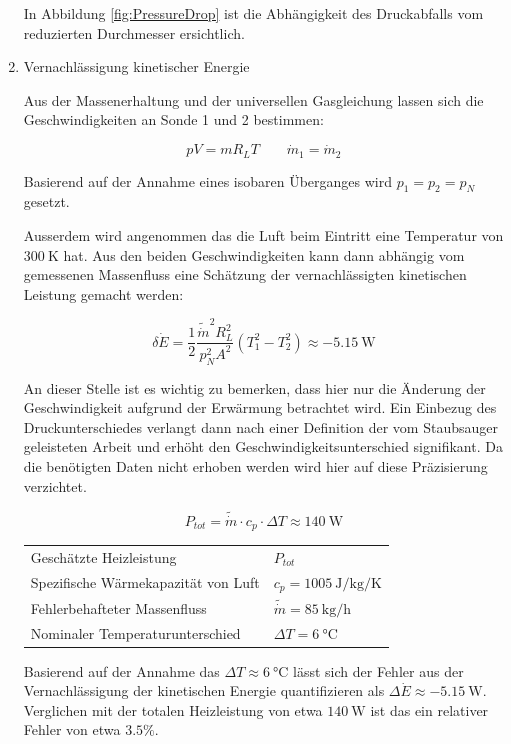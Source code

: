 \documentclass[a4paper,10pt,oneside]{article}
\begin{document}
\begin{enumerate}
In Abbildung \ref{fig:PressureDrop} ist die Abhängigkeit des Druckabfalls vom reduzierten Durchmesser ersichtlich.

\item Vernachlässigung kinetischer Energie

Aus der Massenerhaltung und der universellen Gasgleichung lassen sich die Geschwindigkeiten an Sonde 1 und 2 bestimmen:

\begin{equation}
pV=mR_LT\qquad \dot{m}_1=\dot{m}_2
\end{equation}

Basierend auf der Annahme eines isobaren Überganges wird $p_1=p_2=p_N$ gesetzt.

Ausserdem wird angenommen das die Luft beim Eintritt eine Temperatur von $\SI{300}{\kelvin}$ hat. Aus den beiden Geschwindigkeiten kann dann abhängig vom gemessenen Massenfluss eine Schätzung der vernachlässigten kinetischen Leistung gemacht werden:

\begin{equation}
\delta \dot{E}=\frac{1}{2}\frac{\tilde{\dot{m}}^2R_L^2}{p_N^2A^2}\left(T_1^2-T_2^2\right)\approx \SI{-5.15}{\watt}
\end{equation}

An dieser Stelle ist es wichtig zu bemerken, dass hier nur die Änderung der Geschwindigkeit aufgrund der Erwärmung betrachtet wird. Ein Einbezug des Druckunterschiedes verlangt dann nach einer Definition der vom Staubsauger geleisteten Arbeit und erhöht den Geschwindigkeitsunterschied signifikant. Da die benötigten Daten nicht erhoben werden wird hier auf diese Präzisierung verzichtet.

\begin{equation}
P_{tot}=\tilde{\dot{m}}\cdot c_p\cdot \Delta T\approx \SI{140}{\watt}
\end{equation}

\textcolor{mygray}{
\begin{tabular}{l@{$\quad$}l}
Geschätzte Heizleistung&$P_{tot}$\\
Spezifische Wärmekapazität von Luft&$c_p=\SI{1005}{\joule\per\kilo\gram\per\kelvin}$\\
Fehlerbehafteter Massenfluss&$\tilde{\dot{m}}=\SI{85}{\kilo\gram\per\hour}$\\
Nominaler Temperaturunterschied&$\Delta T= \SI{6}{\celsius}$
\end{tabular}
}

Basierend auf der Annahme das $\Delta T \approx \SI{6}{\celsius}$ lässt sich der Fehler aus der Vernachlässigung der kinetischen Energie quantifizieren als $\Delta \dot{E}\approx \SI{-5.15}{\watt}$. Verglichen mit der totalen Heizleistung von etwa $\SI{140}{\watt}$ ist das ein relativer Fehler von etwa $3.5\%$.

\end{enumerate}
\end{document}
